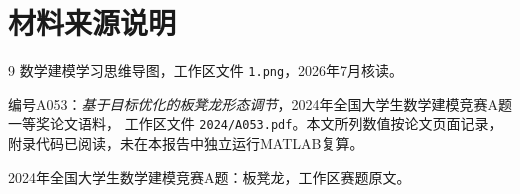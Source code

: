 \section*{材料来源说明}

\begin{thebibliography}{9}
数学建模学习思维导图，工作区文件 \texttt{1.png}，2026年7月核读。

编号A053：\emph{基于目标优化的板凳龙形态调节}，2024年全国大学生数学建模竞赛A题一等奖论文语料，
工作区文件 \texttt{2024/A053.pdf}。本文所列数值按论文页面记录，附录代码已阅读，未在本报告中独立运行MATLAB复算。

2024年全国大学生数学建模竞赛A题：板凳龙，工作区赛题原文。
\end{thebibliography}


